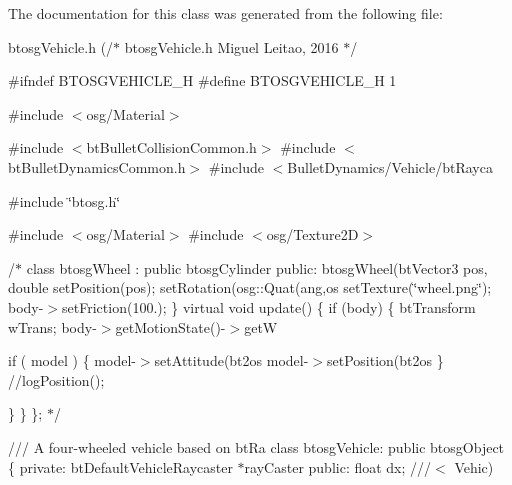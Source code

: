 The documentation for this class was generated from the following file\+:\begin{DoxyCompactItemize}
\item 
btosg\+Vehicle.\+h (/$\ast$
	btosg\+Vehicle.\+h
	\+Miguel Leitao, 2016
$\ast$/

\#ifndef B\+T\+O\+S\+G\+V\+E\+H\+I\+C\+L\+E\+\_\+\+H
\#define B\+T\+O\+S\+G\+V\+E\+H\+I\+C\+L\+E\+\_\+\+H 1

\#include $<$osg/\+Material$>$

\#include $<$bt\+Bullet\+Collision\+Common.\+h$>$
\#include $<$bt\+Bullet\+Dynamics\+Common.\+h$>$
\#include $<$\+Bullet\+Dynamics/\+Vehicle/bt\+Rayca

\#include \char`\"{}btosg.\+h\char`\"{}

\#include $<$osg/\+Material$>$
\#include $<$osg/\+Texture2\+D$>$

/$\ast$
class btosg\+Wheel \+: public btosg\+Cylinder 
    public\+:
        btosg\+Wheel(bt\+Vector3 pos, double
            set\+Position(pos);
            set\+Rotation(osg\+::\+Quat(ang,os
            set\+Texture(\char`\"{}wheel.\+png\char`\"{});
            body-\/$>$set\+Friction(100.);
        \}
        virtual void update() \{
        if (body) \{
            bt\+Transform w\+Trans;
            body-\/$>$get\+Motion\+State()-\/$>$get\+W

            if ( model ) \{
                model-\/$>$set\+Attitude(bt2os
                model-\/$>$set\+Position(bt2os
            \}
            //log\+Position();

        \}
    \}
\};
$\ast$/

/// A four-\/wheeled vehicle based on bt\+Ra
class btosg\+Vehicle\+: public btosg\+Object \{
private\+:
    bt\+Default\+Vehicle\+Raycaster $\ast$ray\+Caster
public\+:
    float dx;			///$<$ Vehic)\end{DoxyCompactItemize}
